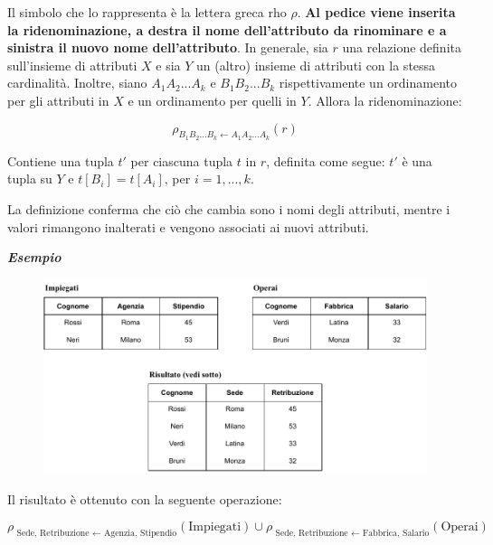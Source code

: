 \documentclass[a4paper]{article}
\begin{document}
	\noindent
	Il simbolo che lo rappresenta è la lettera greca rho $\rho$. \textbf{Al pedice viene inserita la ridenominazione, a destra il nome dell'attributo da rinominare e a sinistra il nuovo nome dell'attributo}. In generale, sia $r$ una relazione definita sull'insieme di attributi $X$ e sia $Y$ un (altro) insieme di attributi con la stessa cardinalità. Inoltre, siano $A_{1} A_{2} ... A_{k}$ e $B_{1} B_{2} ... B_{k}$ rispettivamente un ordinamento per gli attributi in $X$ e un ordinamento per quelli in $Y$. Allora la ridenominazione:
	
	\begin{equation*}
		\rho_{B_{1}B_{2} ... B_{k} \leftarrow A_{1}A_{2} ... A_{k}} \left(r\right)
	\end{equation*}

	\noindent
	Contiene una tupla $t'$ per ciascuna tupla $t$ in $r$, definita come segue: $t'$ è una tupla su $Y$ e $t\left[B_{i}\right] = t\left[A_{i}\right]$, per $i = 1, ..., k$.\newline
	
	\noindent
	La definizione conferma che ciò che cambia sono i nomi degli attributi, mentre i valori rimangono inalterati e vengono associati ai nuovi attributi.\newline
	
	\noindent
	\textcolor{Green4}{\textbf{\emph{Esempio}}}
	
	\begin{figure}[!htp]
		\centering
		\includegraphics[width=\textwidth]{img/ridenominazione.pdf}
	\end{figure}

	\noindent
	Il risultato è ottenuto con la seguente operazione:
	
	\begin{equation*}
		\rho_{\text{ Sede, Retribuzione } \leftarrow \text{ Agenzia, Stipendio}} \left(\text{Impiegati}\right) \cup \rho_{\text{ Sede, Retribuzione } \leftarrow \text{ Fabbrica, Salario}}\left(\text{Operai}\right)
	\end{equation*}
\end{document}
